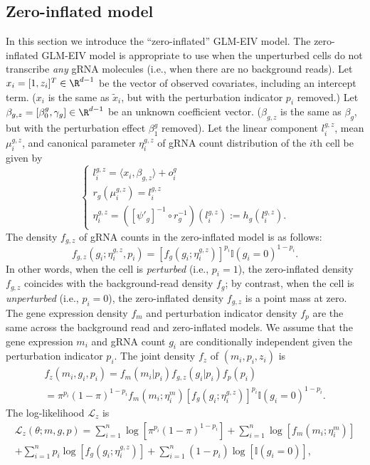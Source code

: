 \documentclass[12pt]{article}
\begin{document}
\begin{appendices}
\section{Zero-inflated model}\label{sec:zero_inf_model}
In this section we introduce the ``zero-inflated'' GLM-EIV model. The zero-inflated GLM-EIV model is appropriate to use when the unperturbed cells do not transcribe \textit{any} gRNA molecules (i.e., when there are no background reads). Let $x_i = [1, z_i]^T \in \R^{d-1}$ be the vector of observed covariates, including an intercept term. ($x_i$ is the same as $\tilde{x}_i$, but with the perturbation indicator $p_i$ removed.) Let $\beta_{g,z} = [\beta^g_0, \gamma_g] \in \R^{d-1}$ be an unknown coefficient vector. ($\beta_{g,z}$ is the same as $\beta_g$, but with the perturbation effect $\beta^g_1$ removed). Let the linear component $l^{g,z}_i$, mean $\mu^{g,z}_i$, and canonical parameter $\eta^{g,z}_i$ of gRNA count distribution of the $i$th cell be given by
$$\begin{cases}
l^{g,z}_i = \langle x_i, \beta_{g,z} \rangle + o^g_i \\
r_g(\mu^{g,z}_i) = l^{g,z}_i \\
\eta^{g,z}_i = ([\psi'_g]^{-1} \circ r^{-1}_g)(l^{g,z}_i) := h_g(l^{g,z}_i).
\end{cases}
$$
The density $f_{g,z}$ of gRNA counts in the zero-inflated model is as follows:
$$f_{g,z}(g_i; \eta^{g,z}_i, p_i) = [f_g(g_i;\eta^{g,z}_i)]^{p_i} \mathbb{I}(g_i = 0)^{1-p_i}.$$
In other words, when the cell is \textit{perturbed} (i.e., $p_i = 1$), the zero-inflated density $f_{g,z}$ coincides with the background-read density $f_g$; by contrast, when the cell is \textit{unperturbed} (i.e., $p_i = 0$), the zero-inflated density $f_{g,z}$ is a point mass at zero. The gene expression density $f_m$ and perturbation indicator density $f_p$ are the same across the background read and zero-inflated models. We assume that the gene expression $m_i$ and gRNA count $g_i$ are conditionally independent given the perturbation indicator $p_i$. The joint density $f_z$ of $(m_i, p_i, z_i)$ is
\begin{multline*}
f_z(m_i, g_i, p_i) = f_m(m_i | p_i) f_{g,z}(g_i | p_i) f_p(p_i) \\ = \pi^{p_i} (1-\pi)^{1-p_i} f_m(m_i; \eta^m_i)[f_g(g_i; \eta_i^{g,z})]^{p_i} \mathbb{I}(g_i = 0)^{1-p_i}.
\end{multline*}
The log-likelihood $\mathcal{L}_z$ is
\begin{multline*}
\mathcal{L}_z(\theta; m, g, p) = \sum_{i=1}^n \log \left[ \pi^{p_i} (1-\pi)^{1-p_i} \right] + \sum_{i=1}^n \log\left[f_m(m_i; \eta^m_i) \right] \\ + \sum_{i=1}^n p_i \log \left[f_{g}(g_i; \eta_i^{g,z}) \right] + \sum_{i=1}^n (1 - p_i)\log\left[ \mathbb{I}(g_i = 0) \right],

\end{multline*}
\end{appendices}
\end{document}

